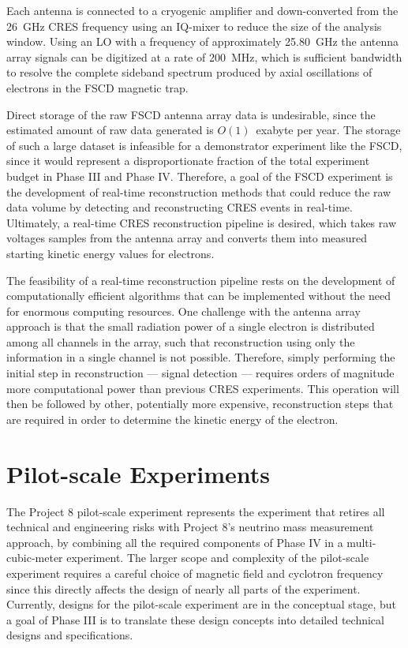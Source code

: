 Each antenna is connected to a cryogenic amplifier and down-converted from the 26~GHz CRES frequency using an IQ-mixer to reduce the size of the analysis window. Using an LO with a frequency of approximately 25.80~GHz the antenna array signals can be digitized at a rate of 200~MHz, which is sufficient bandwidth to resolve the complete sideband spectrum produced by axial oscillations of electrons in the FSCD magnetic trap. 

Direct storage of the raw FSCD antenna array data is undesirable, since the estimated amount of raw data generated is $O(1)$~exabyte per year. The storage of such a large dataset is infeasible for a demonstrator experiment like the FSCD, since it would represent a disproportionate fraction of the total experiment budget in Phase III and Phase IV. Therefore, a goal of the FSCD experiment is the development of real-time reconstruction methods that could reduce the raw data volume by detecting and reconstructing CRES events in real-time. Ultimately, a real-time CRES reconstruction pipeline is desired, which takes raw voltages samples from the antenna array and converts them into measured starting kinetic energy values for electrons.

The feasibility of a real-time reconstruction pipeline rests on the development of computationally efficient algorithms that can be implemented without the need for enormous computing resources. One challenge with the antenna array approach is that the small radiation power of a single electron is distributed among all channels in the array, such that reconstruction using only the information in a single channel is not possible. Therefore, simply performing the initial step in reconstruction --- signal detection --- requires orders of magnitude more computational power than previous CRES experiments. This operation will then be followed by other, potentially more expensive, reconstruction steps that are required in order to determine the kinetic energy of the electron.

\section{Pilot-scale Experiments}
\label{sec:chap3-freq-choice-and-pilot-scale}

The Project 8 pilot-scale experiment represents the experiment that retires all technical and engineering risks with Project 8's neutrino mass measurement approach, by combining all the required components of Phase IV in a multi-cubic-meter experiment. The larger scope and complexity of the pilot-scale experiment requires a careful choice of magnetic field and cyclotron frequency since this directly affects the design of nearly all parts of the experiment. Currently, designs for the pilot-scale experiment are in the conceptual stage, but a goal of Phase III is to translate these design concepts into detailed technical designs and specifications.

